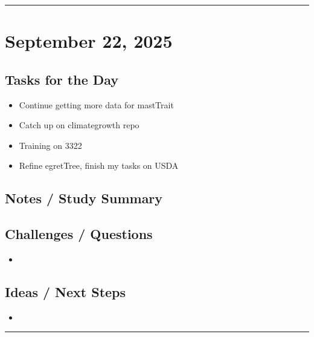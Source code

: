 \documentclass[12pt]{article}
\begin{document}
\vspace{1em}
\hrule
\vspace{1em}

\section*{September 22, 2025}

\subsection*{Tasks for the Day}
\begin{itemize}
    \item Continue getting more data for mastTrait
    \item Catch up on climategrowth repo
    \item Training on 3322
    \item Refine egretTree, finish my tasks on USDA
\end{itemize}
\subsection*{Notes / Study Summary}

\subsection*{Challenges / Questions}
\begin{itemize}
    \item 
\end{itemize}

\subsection*{Ideas / Next Steps}
\begin{itemize}
    \item 
\end{itemize}

\vspace{1em}
\hrule
\vspace{1em}
\end{document}
